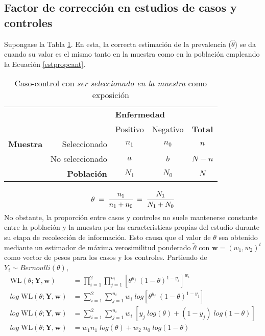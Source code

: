 \subsection{Factor de corrección en estudios de casos y controles}
Supongase la Tabla \ref{tab2x2}. En esta, la correcta estimación de la prevalencia ($\hat{\theta}$) se da cuando su valor es el mismo tanto en la muestra como en la población empleando la Ecuación \ref{estpropcant}.
\begin{table}[htbp]
  \caption{Caso-control con \textit{ser seleccionado en la muestra} como exposición}\label{tab2x2}
  \centering
    \begin{tabular}{rr|cc|c}
    \toprule
          &       & \multicolumn{2}{l|}{\textbf{Enfermedad}} &  \\
          &       & Positivo & Negativo & \textbf{Total} \\
    \midrule
    \multicolumn{1}{l}{\textbf{Muestra}} & Seleccionado & $n_1$     & $n_0$     & $n$ \\
          & No seleccionado & $a$     & $b$     & $N-n$ \\
    \midrule
          & \textbf{Población} & $N_1$   & $N_0$   & $N$ \\
    \bottomrule
    \end{tabular}%
\end{table}%
\begin{equation*}
    \theta \; = \; \cfrac{n_1}{n_1 + n_0} \; = \; \cfrac{N_1}{N_1 + N_0} 
\end{equation*}
No obstante, la proporción entre casos y controles no suele mantenerse constante entre la población y la muestra por las caracteristicas propias del estudio durante su etapa de recolección de información. Esto causa que el valor de $\theta$ sea obtenido mediante un estimador de máxima verosimilitud ponderado $\tilde{\theta}$ con $\textbf{w}=(w_1,w_2)^t$ como vector de pesos para los casos y los controles. Partiendo de $Y_i \sim Bernoulli(\theta)$,
\begin{align*}
\mathrm{WL}(\theta;\textbf{Y},\textbf{w}) &=  \prod_{i=1}^2 \prod_{j=1}^{n_i} \left[ \theta^{y_j} \; (1-\theta)^{1-y_j}\right]^{w_i} \\
log\;\mathrm{WL}(\theta;\textbf{Y},\textbf{w}) &= \sum_{i=1}^2 \sum_{j=1}^{n_i} w_i \; log \left[ \theta^{y_j} \; (1-\theta)^{1-y_j}\right] \\
log\;\mathrm{WL}(\theta;\textbf{Y},\textbf{w}) &= \sum_{i=1}^2 \sum_{j=1}^{n_i} w_i \;  \left[ y_j \; log(\theta) + (1-y_j) \; log (1-\theta) \right]\\
log\;\mathrm{WL}(\theta;\textbf{Y},\textbf{w}) &= w_1 n_1\;log(\theta) + w_2 \; n_0 \; log (1-\theta)
\end{align*}
